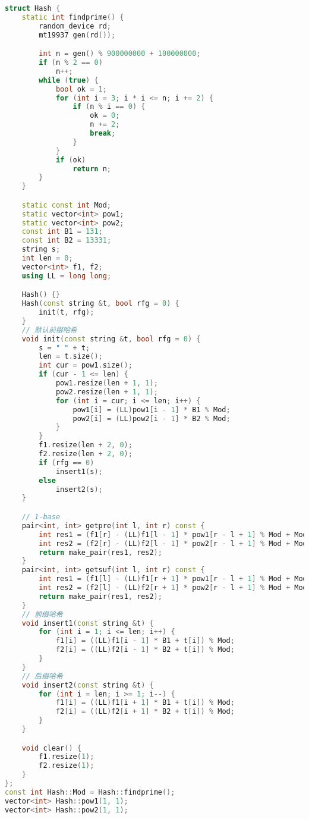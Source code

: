 \begin{lstlisting}[language=C++]
struct Hash {
    static int findprime() {
        random_device rd;
        mt19937 gen(rd());

        int n = gen() % 900000000 + 100000000;
        if (n % 2 == 0)
            n++;
        while (true) {
            bool ok = 1;
            for (int i = 3; i * i <= n; i += 2) {
                if (n % i == 0) {
                    ok = 0;
                    n += 2;
                    break;
                }
            }
            if (ok)
                return n;
        }
    }

    static const int Mod;
    static vector<int> pow1;
    static vector<int> pow2;
    const int B1 = 131;
    const int B2 = 13331;
    string s;
    int len = 0;
    vector<int> f1, f2;
    using LL = long long;

    Hash() {}
    Hash(const string &t, bool rfg = 0) {
        init(t, rfg);
    }
    // 默认前缀哈希
    void init(const string &t, bool rfg = 0) {
        s = " " + t;
        len = t.size();
        int cur = pow1.size();
        if (cur - 1 <= len) {
            pow1.resize(len + 1, 1);
            pow2.resize(len + 1, 1);
            for (int i = cur; i <= len; i++) {
                pow1[i] = (LL)pow1[i - 1] * B1 % Mod;
                pow2[i] = (LL)pow2[i - 1] * B2 % Mod;
            }
        }
        f1.resize(len + 2, 0);
        f2.resize(len + 2, 0);
        if (rfg == 0)
            insert1(s);
        else
            insert2(s);
    }

    // 1-base
    pair<int, int> getpre(int l, int r) const {
        int res1 = (f1[r] - (LL)f1[l - 1] * pow1[r - l + 1] % Mod + Mod) % Mod;
        int res2 = (f2[r] - (LL)f2[l - 1] * pow2[r - l + 1] % Mod + Mod) % Mod;
        return make_pair(res1, res2);
    }
    pair<int, int> getsuf(int l, int r) const {
        int res1 = (f1[l] - (LL)f1[r + 1] * pow1[r - l + 1] % Mod + Mod) % Mod;
        int res2 = (f2[l] - (LL)f2[r + 1] * pow2[r - l + 1] % Mod + Mod) % Mod;
        return make_pair(res1, res2);
    }
    // 前缀哈希
    void insert1(const string &t) {
        for (int i = 1; i <= len; i++) {
            f1[i] = ((LL)f1[i - 1] * B1 + t[i]) % Mod;
            f2[i] = ((LL)f2[i - 1] * B2 + t[i]) % Mod;
        }
    }
    // 后缀哈希
    void insert2(const string &t) {
        for (int i = len; i >= 1; i--) {
            f1[i] = ((LL)f1[i + 1] * B1 + t[i]) % Mod;
            f2[i] = ((LL)f2[i + 1] * B2 + t[i]) % Mod;
        }
    }

    void clear() {
        f1.resize(1);
        f2.resize(1);
    }
};
const int Hash::Mod = Hash::findprime();
vector<int> Hash::pow1(1, 1);
vector<int> Hash::pow2(1, 1);
\end{lstlisting}

